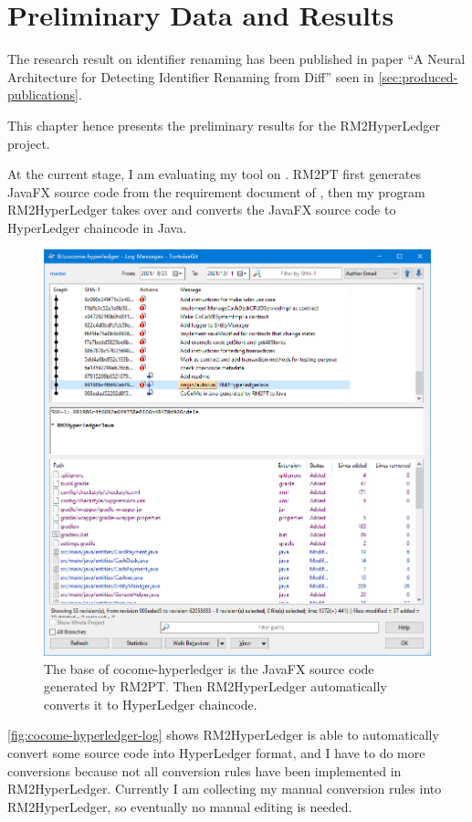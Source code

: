 \chapter{Preliminary Data and Results}

The research result on identifier renaming has been published in paper ``A Neural Architecture for Detecting Identifier Renaming from Diff'' seen in \autoref*{sec:produced-publications}.

This chapter hence presents the preliminary results for the RM2HyperLedger project.

At the current stage, I am evaluating my tool on \cocome. RM2PT first generates JavaFX source code from the requirement document of \cocome, then my program RM2HyperLedger takes over and converts the JavaFX source code to HyperLedger chaincode in Java.

\begin{figure}[ht]
\centering
\includegraphics[width=0.9\linewidth]{cocome-hyperledger-log}
\caption{The base of cocome-hyperledger is the JavaFX source code generated by RM2PT. Then RM2HyperLedger automatically converts it to HyperLedger chaincode.}
\label{fig:cocome-hyperledger-log}
\end{figure}

\autoref{fig:cocome-hyperledger-log} shows RM2HyperLedger is able to automatically convert some source code into HyperLedger format, and I have to do more conversions because not all conversion rules have been implemented in RM2HyperLedger. Currently I am collecting my manual conversion rules into RM2HyperLedger, so eventually no manual editing is needed.

